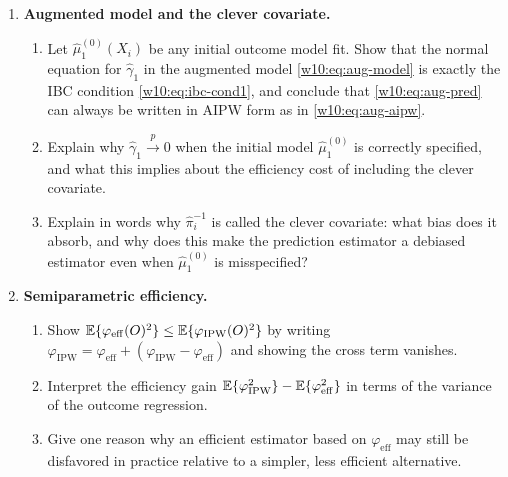 \documentclass[master.tex]{subfiles}
\begin{document}
\begin{enumerate}
\item \textbf{Augmented model and the clever covariate.}
  \begin{enumerate}
    \item Let $\hat\mu_1^{(0)}(X_i)$ be any initial outcome model
      fit.  Show that the normal equation for $\hat\gamma_1$ in
      the augmented model \eqref{w10:eq:aug-model} is exactly the
      IBC condition \eqref{w10:eq:ibc-cond1}, and conclude
      that \eqref{w10:eq:aug-pred} can always be written in AIPW
      form as in \eqref{w10:eq:aug-aipw}.
    \item Explain why $\hat\gamma_1 \overset{p}{\to} 0$ when the
      initial model $\hat\mu_1^{(0)}$ is correctly specified, and
      what this implies about the efficiency cost of including the
      clever covariate.
    \item Explain in words why $\hat\pi_i^{-1}$ is called the clever
      covariate: what bias does it absorb, and why does this make the
      prediction estimator a debiased estimator even when
      $\hat\mu_1^{(0)}$ is misspecified?
  \end{enumerate}

\item \textbf{Semiparametric efficiency.}
  \begin{enumerate}
    \item Show $\mathbb{E}\{\varphi_{\mathrm{eff}}(O)^2\}
      \leq \mathbb{E}\{\varphi_{\mathrm{IPW}}(O)^2\}$ by writing
      $\varphi_{\mathrm{IPW}} = \varphi_{\mathrm{eff}}
       + (\varphi_{\mathrm{IPW}}-\varphi_{\mathrm{eff}})$ and
      showing the cross term vanishes.
    \item Interpret the efficiency gain
      $\mathbb{E}\{\varphi_{\mathrm{IPW}}^2\}-\mathbb{E}\{\varphi_{\mathrm{eff}}^2\}$
      in terms of the variance of the outcome regression.
    \item Give one reason why an efficient estimator based on
      $\varphi_{\mathrm{eff}}$ may still be disfavored in
      practice relative to a simpler, less efficient alternative.
  \end{enumerate}

\end{enumerate}

\ifSubfilesClassLoaded{%
  
  
}{}
\end{document}
